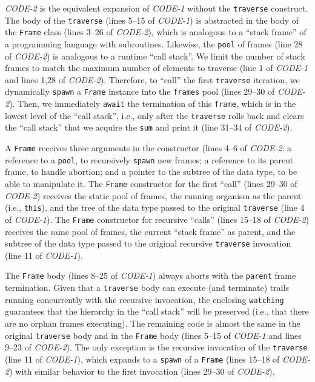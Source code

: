 \documentclass{sig-alternate}
\newcommand{\code}[1] {{\small{\texttt{#1}}}}
\begin{document}
\emph{CODE-2} is the equivalent expansion of \emph{CODE-1} without the 
\code{traverse} construct.
The body of the \code{traverse} (lines 5--15 of \emph{CODE-1}) is abstracted in 
the body of the \code{Frame} class (lines 3--26 of \emph{CODE-2}), which is 
analogous to a ``stack frame'' of a programming language with subroutines.
Likewise, the \code{pool} of frames (line 28 of \emph{CODE-2}) is analogous to 
a runtime ``call stack''.
We limit the number of stack frames to match the maximum number of elements to 
traverse (line 1 of \emph{CODE-1} and lines 1,28 of \emph{CODE-2}).
Therefore, to ``call'' the first \code{traverse} iteration, we dynamically 
\code{spawn} a \code{Frame} instance into the \code{frames} pool (lines 29--30 
of \emph{CODE-2}).
Then, we immediately \code{await} the termination of this \code{frame}, which 
is in the lowest level of the ``call stack'', i.e., only after the 
\code{traverse} rolls back and clears the ``call stack'' that we acquire the 
\code{sum} and print it (line 31--34 of \emph{CODE-2}).

A \code{Frame} receives three arguments in the constructor (lines 4--6 of 
\emph{CODE-2}:
a reference to a \code{pool}, to recursively \code{spawn} new frames;
a reference to its parent frame, to handle abortion;
and a pointer to the subtree of the data type, to be able to manipulate it.
%
The \code{Frame} constructor for the first ``call'' (lines 29--30 of 
\emph{CODE-2}) receives the static pool of frames, the running organism as the 
parent (i.e., \code{this}), and the tree of the data type passed to the 
original \code{traverse} (line 4 of \emph{CODE-1}).
%
The \code{Frame} constructor for recursive ``calls'' (lines 15--18 of 
\emph{CODE-2}) receives the same pool of frames, the current ``stack frame'' as 
parent, and the subtree of the data type passed to the original recursive 
\code{traverse} invocation (line 11 of \emph{CODE-1}).

The \code{Frame} body (lines 8--25 of \emph{CODE-1}) always aborts with the
\code{parent} frame termination.
Given that a \code{traverse} body can execute (and terminate) trails running 
concurrently with the recursive invocation, the enclosing \code{watching} 
guarantees that the hierarchy in the ``call stack'' will be preserved (i.e., 
that there are no orphan frames executing).
%
The remaining code is almost the same in the original \code{traverse} body and 
in the \code{Frame} body (lines 5--15 of \emph{CODE-1} and lines 9--23 of 
\emph{CODE-2}).
The only exception is the recursive invocation of the \code{traverse} (line 11 
of \emph{CODE-1}), which expands to a \code{spawn} of a \code{Frame} (lines 
15--18 of \emph{CODE-2}) with similar behavior to the first invocation (lines 
29--30 of \emph{CODE-2}).
\end{document}
